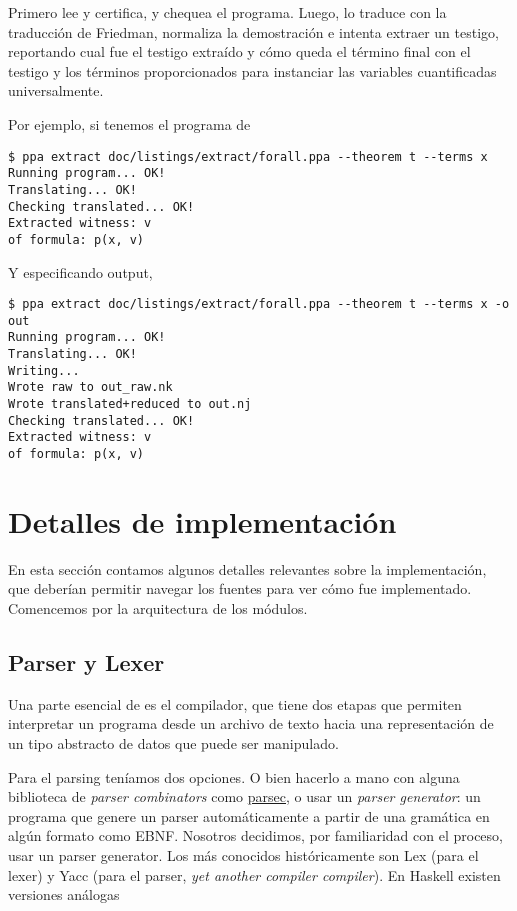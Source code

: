 Primero lee y certifica, y chequea el programa. Luego, lo traduce con la
traducción de Friedman, normaliza la demostración e intenta extraer un testigo,
reportando cual fue el testigo extraído y cómo queda el término final con el
testigo y los términos proporcionados para instanciar las variables
cuantificadas universalmente.

Por ejemplo, si tenemos el programa de 

\begin{verbatim}
$ ppa extract doc/listings/extract/forall.ppa --theorem t --terms x
Running program... OK!
Translating... OK!
Checking translated... OK!
Extracted witness: v
of formula: p(x, v)
\end{verbatim}

Y especificando output,

\begin{verbatim}
$ ppa extract doc/listings/extract/forall.ppa --theorem t --terms x -o out
Running program... OK!
Translating... OK!
Writing...
Wrote raw to out_raw.nk
Wrote translated+reduced to out.nj
Checking translated... OK!
Extracted witness: v
of formula: p(x, v) 
\end{verbatim}

\section{Detalles de implementación}

En esta sección contamos algunos detalles relevantes sobre la implementación,
que deberían permitir navegar los fuentes para ver cómo fue implementado.
Comencemos por la arquitectura de los módulos.

\subsection{Parser y Lexer}

Una parte esencial de \ppaTool{} es el compilador, que tiene dos etapas que
permiten interpretar un programa desde un archivo de texto hacia una
representación de un tipo abstracto de datos que puede ser manipulado.

Para el parsing teníamos dos opciones. O bien hacerlo a mano con alguna
biblioteca de \textit{parser combinators} como
\href{https://hackage.haskell.org/package/parsec}{parsec}, o usar un
\textit{parser generator}: un programa que genere un parser automáticamente a
partir de una gramática en algún formato como EBNF. Nosotros decidimos, por
familiaridad con el proceso, usar un parser generator. Los más conocidos
históricamente son Lex (para el lexer) y Yacc (para el parser, \textit{yet
another compiler compiler}). En Haskell existen versiones análogas

